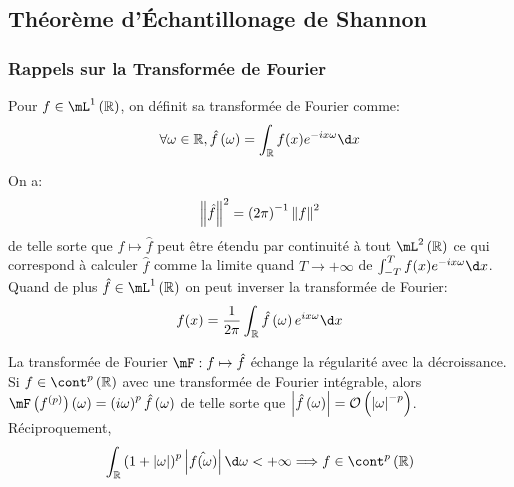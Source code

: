 \documentclass{cours}
\begin{document}
\subsection{Théorème d'Échantillonage de Shannon}
\subsubsection{Rappels sur la Transformée de Fourier}
\begin{definition}
Pour $f \in \mL^{1}\left(\R\right)$, on définit sa transformée de Fourier comme:
\begin{equation}
\forall \omega\in\R, \hat{f}\left(\omega\right) = \int_{\R}f(x)e^{-ix\omega}\d x
\end{equation}
\label{def:fourier_transform}
\end{definition}

\begin{proposition}
	On a:
	\begin{equation*}
		\left\lVert \hat{f}\right\rVert^{2} = \left(2\pi\right)^{-1}\left\lVert f\right\rVert^{2}
	\end{equation*}
	de telle sorte que $f \mapsto \hat{f}$ peut être étendu par continuité à tout $\mL^{2}\left(\R\right)$ ce qui correspond à calculer $\hat{f}$ comme la limite quand $T\to +\infty$ de $\int_{-T}^{T}f(x)e^{-ix\omega}\d x$.
	Quand de plus $\hat{f} \in \mL^{1}\left(\R\right)$ on peut inverser la transformée de Fourier:
	\begin{equation*}
		f(x) = \frac{1}{2\pi}\int_{\R}\hat{f}\left(\omega\right)e^{ix\omega}\d x
	\end{equation*}
	\label{prop:inv_fourier}
\end{proposition}

\begin{proposition}
	La transformée de Fourier $\mF: f\mapsto\hat{f}$ échange la régularité avec la décroissance.
	Si $f \in \cont^{p}\left(\R\right)$ avec une transformée de Fourier intégrable,
	alors $\mF\left(f^{(p)}\right)\left(\omega\right) = \left(i\omega\right)^{p}\hat{f}\left(\omega\right)$
	de telle sorte que $\left|\hat{f}\left(\omega\right)\right| = \mathcal{O}\left(\left|\omega\right|^{-p}\right)$.
	Réciproquement,
	\begin{equation*}
		\int_{\R} \left(1 + \abs{\omega}\right)^{p}\abs{\hat{f(\omega)}} \d \omega < +\infty \Longrightarrow f\in \cont^{p}\left(\R\right)
	\end{equation*}
	\label{prop:reg_fourier}
\end{proposition}
\end{document}

